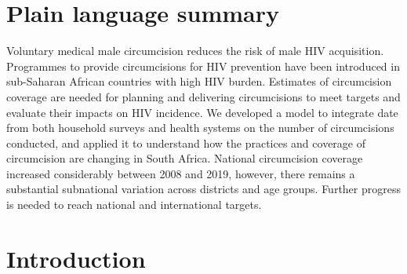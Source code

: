 \documentclass{article}
\begin{document}
\newpage 


\section*{Plain language summary}


Voluntary medical male circumcision reduces the risk of male HIV acquisition. Programmes to provide circumcisions for HIV prevention have been introduced in sub-Saharan African countries with high HIV burden. Estimates of circumcision coverage are needed for planning and delivering circumcisions to meet targets and evaluate their impacts on HIV incidence. We developed a model to integrate date from both household surveys and health systems on the number of circumcisions conducted, and applied it to understand how the practices and coverage of circumcision are changing in South Africa. National circumcision coverage increased considerably between 2008 and 2019, however, there remains a substantial subnational variation across districts and age groups. Further progress is needed to reach national and international targets. 

\newpage 


\section*{Introduction}

\end{document}
